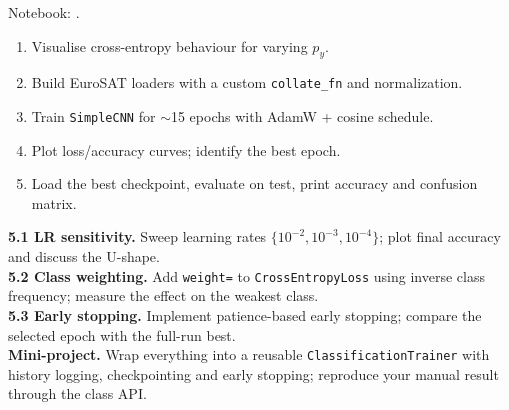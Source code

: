 \begin{practbox}
Notebook: .
\begin{enumerate}[leftmargin=1.4em,nosep]
  \item Visualise cross-entropy behaviour for varying $p_y$.
  \item Build EuroSAT loaders with a custom \texttt{collate\_fn} and normalization.
  \item Train \texttt{SimpleCNN} for $\sim$15 epochs with AdamW + cosine schedule.
  \item Plot loss/accuracy curves; identify the best epoch.
  \item Load the best checkpoint, evaluate on test, print accuracy and confusion matrix.
\end{enumerate}
\end{practbox}

\begin{exbox}
\textbf{5.1 LR sensitivity.} Sweep learning rates $\{10^{-2},10^{-3},10^{-4}\}$;
plot final accuracy and discuss the U-shape.\\[2pt]
\textbf{5.2 Class weighting.} Add \texttt{weight=} to \texttt{CrossEntropyLoss}
using inverse class frequency; measure the effect on the weakest class.\\[2pt]
\textbf{5.3 Early stopping.} Implement patience-based early stopping; compare the
selected epoch with the full-run best.\\[2pt]
\textbf{Mini-project.} Wrap everything into a reusable \texttt{ClassificationTrainer}
with history logging, checkpointing and early stopping; reproduce your manual
result through the class API.
\end{exbox}
